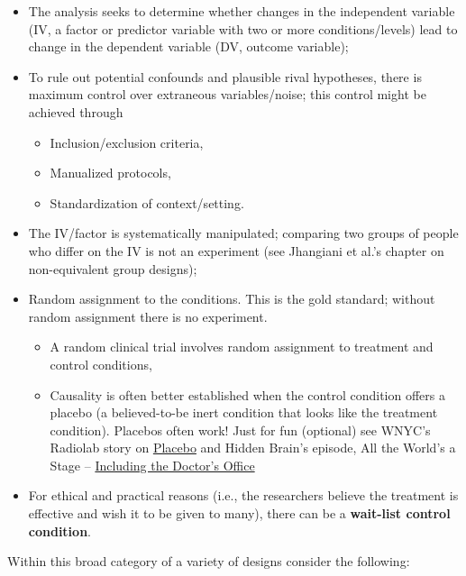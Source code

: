 \documentclass[
  english,
]{book}
\providecommand{\tightlist}{%
  \setlength{\itemsep}{0pt}\setlength{\parskip}{0pt}}
\begin{document}
\begin{itemize}
\tightlist
\item
  The analysis seeks to determine whether changes in the independent variable (IV, a factor or predictor variable with two or more conditions/levels) lead to change in the dependent variable (DV, outcome variable);
\item
  To rule out potential confounds and plausible rival hypotheses, there is maximum control over extraneous variables/noise; this control might be achieved through

  \begin{itemize}
  \tightlist
  \item
    Inclusion/exclusion criteria,
  \item
    Manualized protocols,
  \item
    Standardization of context/setting.
  \end{itemize}
\item
  The IV/factor is systematically manipulated; comparing two groups of people who differ on the IV is not an experiment (see Jhangiani et al.'s \citeyearpar{jhangiani_research_2019} chapter on non-equivalent group designs);
\item
  Random assignment to the conditions. This is the gold standard; without random assignment there is no experiment.

  \begin{itemize}
  \tightlist
  \item
    A random clinical trial involves random assignment to treatment and control conditions,
  \item
    Causality is often better established when the control condition offers a placebo (a believed-to-be inert condition that looks like the treatment condition). Placebos often work! Just for fun (optional) see WNYC's Radiolab story on \href{https://www.wnycstudios.org/podcasts/radiolab/episodes/91539-placebo}{Placebo} and Hidden Brain's episode, All the World's a Stage -- \href{https://www.npr.org/2020/05/11/853753307/all-the-worlds-a-stage-including-the-doctor-s-office}{Including the Doctor's Office}
  \end{itemize}
\item
  For ethical and practical reasons (i.e., the researchers believe the treatment is effective and wish it to be given to many), there can be a \textbf{wait-list control condition}.
\end{itemize}

Within this broad category of a variety of designs consider the following:
\end{document}
